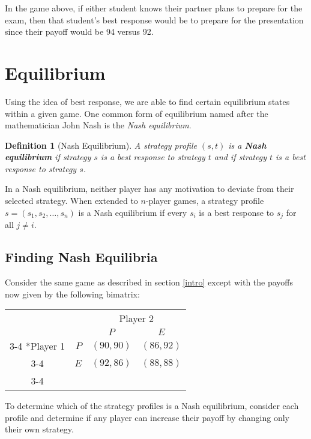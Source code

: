 \documentclass[twoside]{article}
\newtheorem{definition}[theorem]{Definition}
\begin{document}
In the game above, if either student knows their partner plans to prepare for the exam, then that student's best response would be to prepare for the presentation since their payoff would be 94 versus 92.

\section{Equilibrium}
Using the idea of best response, we are able to find certain equilibrium states within a given game. One common form of equilibrium named after the mathematician John Nash is the \textit{Nash equilibrium}.

\begin{definition}[Nash Equilibrium]
A strategy profile $(s,t)$ is a \textbf{Nash equilibrium} if strategy $s$ is a best response to strategy $t$ and if strategy $t$ is a best response to strategy $s$.
\end{definition}

In a Nash equilibrium, neither player has any motivation to deviate from their selected strategy. When extended to $n$-player games, a strategy profile $s=(s_1, s_2, \ldots, s_n)$ is a Nash equilibrium if every $s_i$ is a best response to $s_j$ for all $j \ne i$.

\subsection{Finding Nash Equilibria}
Consider the same game as described in section \ref{intro} except with the payoffs now given by the following bimatrix:

\begin{table}[h]
\centering
\renewcommand{\arraystretch}{1.5}
\begin{tabular}{cr|c|c|}
& \multicolumn{1}{c}{} & \multicolumn{2}{c}{Player 2} \\
& \multicolumn{1}{c}{} & \multicolumn{1}{c}{$P$} & \multicolumn{1}{c}{$E$} \\ \cline{3-4}
\multirow{2}*{Player 1}  & $P$ & $(90, 90)$ & $(86, 92)$ \\ \cline{3-4}
& $E$ & $(92, 86)$ & $(88, 88)$ \\ \cline{3-4}
\end{tabular}
\end{table}

To determine which of the strategy profiles is a Nash equilibrium, consider each profile and determine if any player can increase their payoff by changing only their own strategy.
\end{document}
